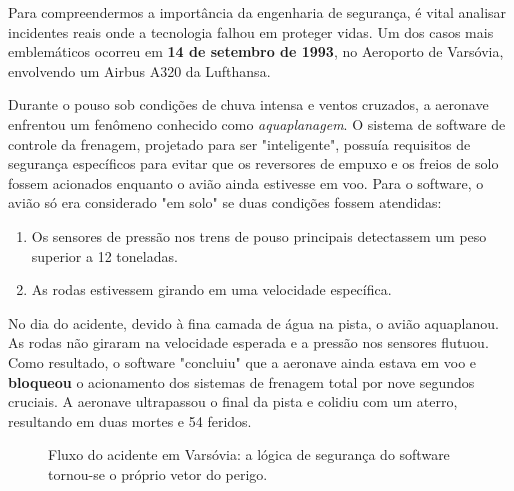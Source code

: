\documentclass[12pt,a4paper]{report}
\begin{document}
Para compreendermos a importância da engenharia de segurança, é vital analisar incidentes reais onde a tecnologia falhou em proteger vidas. Um dos casos mais emblemáticos ocorreu em \textbf{14 de setembro de 1993}, no Aeroporto de Varsóvia, envolvendo um Airbus A320 da Lufthansa.

Durante o pouso sob condições de chuva intensa e ventos cruzados, a aeronave enfrentou um fenômeno conhecido como \emph{aquaplanagem}. O sistema de software de controle da frenagem, projetado para ser "inteligente", possuía requisitos de segurança específicos para evitar que os reversores de empuxo e os freios de solo fossem acionados enquanto o avião ainda estivesse em voo. Para o software, o avião só era considerado "em solo" se duas condições fossem atendidas:
\begin{enumerate}
    \item Os sensores de pressão nos trens de pouso principais detectassem um peso superior a 12 toneladas.
    \item As rodas estivessem girando em uma velocidade específica.
\end{enumerate}

No dia do acidente, devido à fina camada de água na pista, o avião aquaplanou. As rodas não giraram na velocidade esperada e a pressão nos sensores flutuou. Como resultado, o software "concluiu" que a aeronave ainda estava em voo e \textbf{bloqueou} o acionamento dos sistemas de frenagem total por nove segundos cruciais. A aeronave ultrapassou o final da pista e colidiu com um aterro, resultando em duas mortes e 54 feridos.

\begin{figure}[h]
    \centering
    \caption{Fluxo do acidente em Varsóvia: a lógica de segurança do software tornou-se o próprio vetor do perigo.}
\end{figure}
\end{document}
